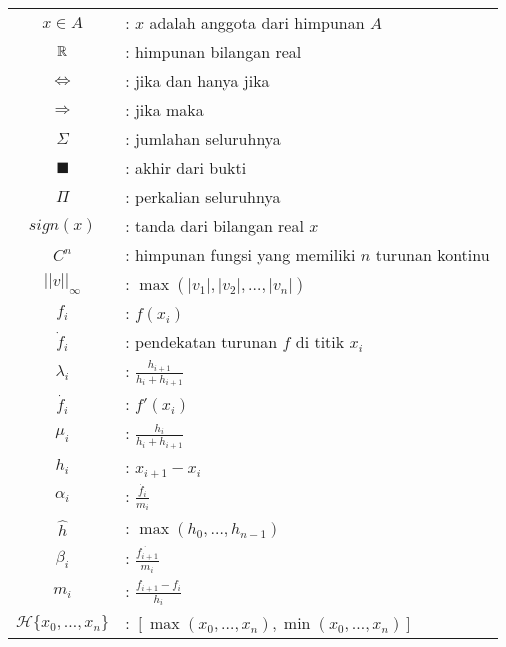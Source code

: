 \documentclass{skripsimathugm}
\begin{document}
\lambang
\begin{tabular}{cp{10.5cm}}
    $x\in A$ & : $x$ adalah anggota dari himpunan $A$\\
    $\mathbb{R}$ & : himpunan bilangan real\\
    $\Leftrightarrow$ & : jika dan hanya jika \\
    $\Rightarrow$ & : jika maka\\
    $\Sigma$ & : jumlahan seluruhnya \\
    $\blacksquare$ & : akhir dari bukti \\
    $\Pi$ & : perkalian seluruhnya\\
    $sign(x)$ & : tanda dari bilangan real $x$\\
    $C^n$ & : himpunan fungsi yang memiliki $n$ turunan kontinu\\
    $||v||_\infty$ & : $\max(|v_1|,|v_2|,\dots,|v_n|)$\\
    $f_i$ & : $f(x_i)$ \\
    $\dot{f}_i$ & : pendekatan turunan $f$ di titik $x_i$\\
    $\lambda_i$ & : $\frac{h_{i+1}}{h_i+h_{i+1}}$\\
    $\dot{f_i}$ & : $f'(x_i)$\\
    $\mu_i$ & : $\frac{h_i}{h_i+h_{i+1}}$\\
    $h_i$ & : $x_{i+1}-x_i$\\
    $\alpha_i$ & : $\frac{\dot{f_i}}{m_i}$\\
    $\hat{h}$ & : $\max(h_0,\dots,h_{n-1})$\\
    $\beta_i$ & : $\frac{\dot{f_{i+1}}}{m_i}$\\
    $m_i$ & : $\frac{f_{i+1}-f_i}{h_i}$\\
    $\mathcal{H} \{x_0,\dots,x_n\}$ & : $[\max(x_0,\dots,x_n),\min(x_0,\dots,x_n)]$
\end{tabular}

\end{document}
